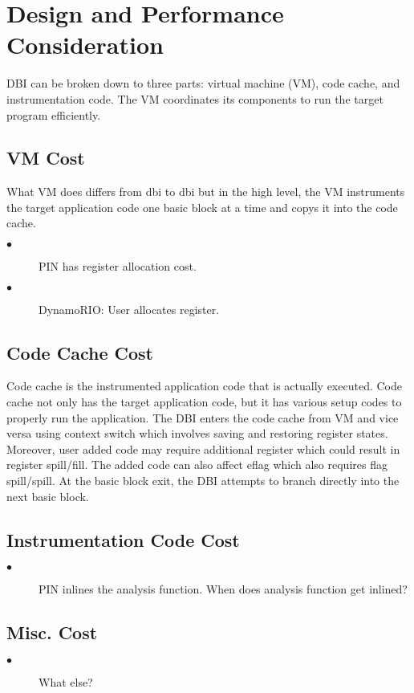 \section{Design and Performance Consideration}
\label{sec:design}
DBI can be broken down to three parts: virtual machine (VM), code cache, and instrumentation code. The VM coordinates its components to run the target program efficiently. 
\subsection{VM Cost}
What VM does differs from dbi to dbi but in the high level, the VM instruments the target application code one basic block at a time and copys it into the code cache. 
\begin{description}
  \item[$\bullet$] PIN has register allocation cost.
  \item[$\bullet$] DynamoRIO: User allocates register.
\end{description}
\subsection{Code Cache Cost}
Code cache is the instrumented application code that is actually executed. Code cache not only has the target application code, but it has various setup codes to properly run the application. The DBI enters the code cache from VM and vice versa using context switch which involves saving and restoring register states. Moreover, user added code may require additional register which could result in register spill/fill. The added code can also affect eflag which also requires flag spill/spill. At the basic block exit, the DBI attempts to branch directly into the next basic block.
\subsection{Instrumentation Code Cost}
\begin{description}
  \item[$\bullet$] PIN inlines the analysis function. When does analysis function get inlined?
\end{description}
\subsection{Misc. Cost}
\begin{description}
  \item[$\bullet$] What else?
\end{description}
